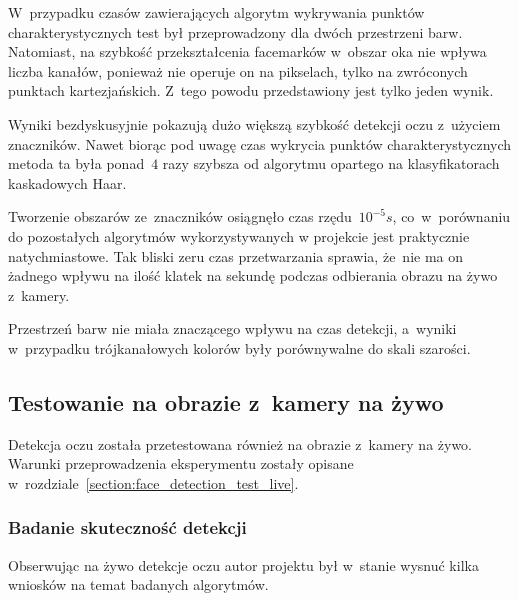 \par 

W~przypadku czasów zawierających algorytm wykrywania punktów charakterystycznych test był przeprowadzony dla dwóch przestrzeni barw. Natomiast, na szybkość przekształcenia facemarków w~obszar oka nie wpływa liczba kanałów, ponieważ nie operuje on na pikselach, tylko na zwróconych punktach kartezjańskich. Z~tego powodu przedstawiony jest tylko jeden wynik.

\vspace{4mm}



\par

Wyniki bezdyskusyjnie pokazują dużo większą szybkość detekcji oczu z~użyciem znaczników. Nawet biorąc pod uwagę czas wykrycia punktów charakterystycznych metoda ta była ponad~$4$ razy szybsza od algorytmu opartego na klasyfikatorach kaskadowych Haar. 

\par

Tworzenie obszarów ze~znaczników osiągnęło czas rzędu~$10^{-5}s$, co~w~porównaniu do pozostałych algorytmów wykorzystywanych w projekcie jest praktycznie natychmiastowe. Tak bliski zeru czas przetwarzania sprawia, że~nie ma on żadnego wpływu na ilość klatek na sekundę podczas odbierania obrazu na żywo z~kamery.

\par

Przestrzeń barw nie miała znaczącego wpływu na czas detekcji, a~wyniki w~przypadku trójkanałowych kolorów były porównywalne do skali szarości.




\subsection{Testowanie na obrazie z~kamery na żywo}

Detekcja oczu została przetestowana również na obrazie z~kamery na żywo. Warunki przeprowadzenia eksperymentu zostały opisane w~rozdziale~\hyperref[{section:face_detection_test_live}]{\ref{section:face_detection_test_live}}.

\subsubsection{Badanie skuteczność detekcji}

Obserwując na żywo detekcje oczu autor projektu był w~stanie wysnuć kilka wniosków na temat badanych algorytmów.

